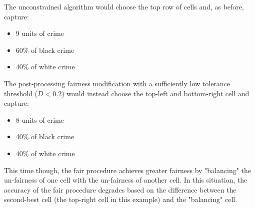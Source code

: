 The unconstrained algorithm would choose the top row of cells and, as before, capture:
\begin{itemize}
    \item 9 units of crime
    \item 60\% of black crime
    \item 40\% of white crime
\end{itemize}
The post-processing fairness modification with a sufficiently low tolerance threshold ($D < 0.2$) would instead choose the top-left and bottom-right cell and capture:
\begin{itemize}
    \item 8 units of crime
    \item 40\% of black crime
    \item 40\% of white crime
\end{itemize}
This time though, the fair procedure achieves greater fairness by "balancing" the un-fairness of one cell with the un-fairness of another cell. In this situation, the accuracy of the fair procedure degrades based on the difference between the second-best cell (the top-right cell in this example) and the "balancing" cell.
